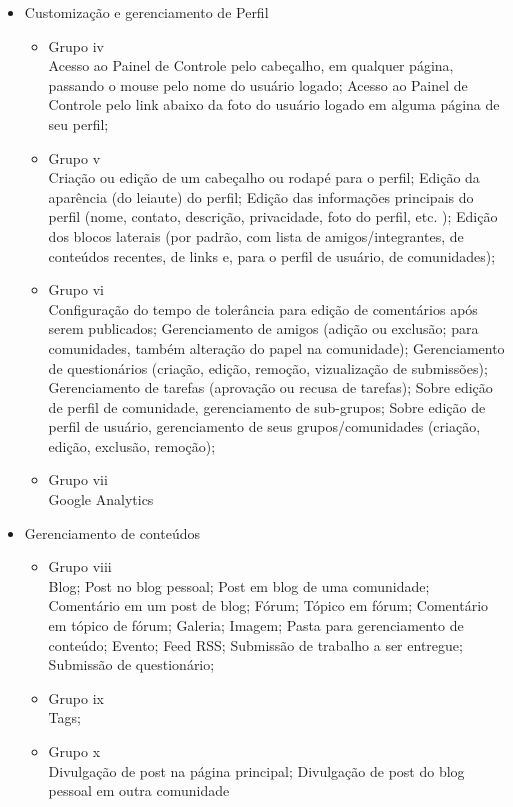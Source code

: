 \begin{itemize}
\item Customização e gerenciamento de Perfil \\
    \begin{itemize}
    \item Grupo iv\\
    Acesso ao Painel de Controle pelo cabeçalho, em qualquer página, passando o mouse pelo nome do usuário logado; Acesso ao Painel de Controle pelo link abaixo da foto do usuário logado em alguma página de seu perfil; 
    \item Grupo v\\
    Criação ou edição de um cabeçalho ou rodapé para o perfil; Edição da aparência (do leiaute) do perfil; Edição das informações principais do perfil (nome, contato, descrição, privacidade, foto do perfil, etc. ); Edição dos blocos laterais (por padrão, com lista de amigos/integrantes, de conteúdos recentes, de links e, para o perfil de usuário, de comunidades); 
    \item Grupo vi\\
Configuração do tempo de tolerância para edição de comentários após serem publicados; Gerenciamento de amigos (adição ou exclusão; para comunidades, também alteração do papel na comunidade); Gerenciamento de questionários (criação, edição, remoção, vizualização de submissões); Gerenciamento de tarefas (aprovação ou recusa de tarefas); Sobre edição de perfil de comunidade, gerenciamento de sub-grupos; Sobre edição de perfil de usuário, gerenciamento de seus grupos/comunidades (criação, edição, exclusão, remoção); 
    \item Grupo vii\\
Google Analytics
    \end{itemize}

\item Gerenciamento de conteúdos \\
    \begin{itemize}
    \item Grupo viii\\
    Blog; Post no blog pessoal; Post em blog de uma comunidade; Comentário em um post de blog; Fórum; Tópico em fórum; Comentário em tópico de fórum; Galeria; Imagem; Pasta para gerenciamento de conteúdo; Evento; Feed RSS; Submissão de trabalho a ser entregue; Submissão de questionário; 
    \item Grupo ix\\
Tags; 
    \item Grupo x\\
Divulgação de post na página principal; Divulgação de post do blog pessoal em outra comunidade
    \end{itemize}


\end{itemize}
